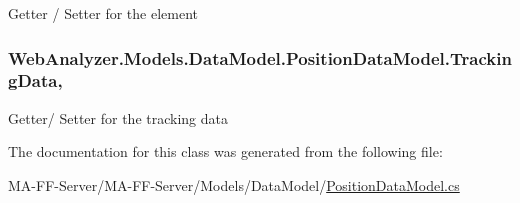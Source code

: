 Getter / Setter for the element 

\hypertarget{class_web_analyzer_1_1_models_1_1_data_model_1_1_position_data_model_a1a065fa193e20137daa08472eefafd66}{}
\subsubsection[{Tracking\+Data}]{ Web\+Analyzer.\+Models.\+Data\+Model.\+Position\+Data\+Model.\+Tracking\+Data\hspace{0.3cm}{\ttfamily [get]}, {\ttfamily [set]}}\label{class_web_analyzer_1_1_models_1_1_data_model_1_1_position_data_model_a1a065fa193e20137daa08472eefafd66}


Getter/ Setter for the tracking data 



The documentation for this class was generated from the following file\+:\begin{DoxyCompactItemize}
\item 
M\+A-\/\+F\+F-\/\+Server/\+M\+A-\/\+F\+F-\/\+Server/\+Models/\+Data\+Model/\hyperlink{_position_data_model_8cs}{Position\+Data\+Model.\+cs}\end{DoxyCompactItemize}
